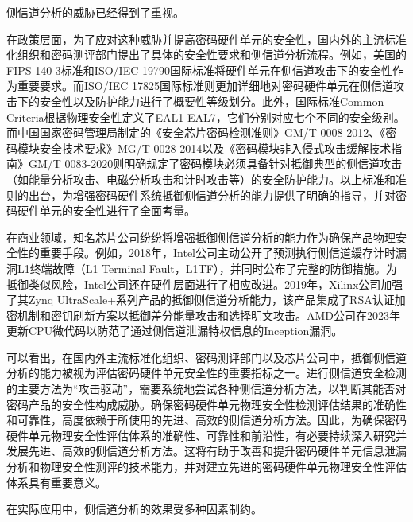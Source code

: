 {	侧信道分析的威胁已经得到了重视。
	
	在政策层面，为了应对这种威胁并提高密码硬件单元的安全性，国内外的主流标准化组织和密码测评部门提出了具体的安全性要求和侧信道分析流程。例如，美国的FIPS 140-3标准\citep{FIPS140-3}和ISO/IEC 19790\citep{ISO/IEC19790}国际标准将硬件单元在侧信道攻击下的安全性作为重要要求。而ISO/IEC 17825\citep{ISO/IEC17825}国际标准则更加详细地对密码硬件单元在侧信道攻击下的安全性以及防护能力进行了概要性等级划分。此外，国际标准Common Criteria\citep{CCMB-2017-04-001}根据物理安全性定义了EAL1-EAL7，它们分别对应七个不同的安全级别。而中国国家密码管理局制定的《安全芯片密码检测准则》GM/T 0008-2012\citep{GM/T0008}、《密码模块安全技术要求》MG/T 0028-2014\citep{GM/T0028}以及《密码模块非入侵式攻击缓解技术指南》GM/T 0083-2020\citep{GM/T0083}则明确规定了密码模块必须具备针对抵御典型的侧信道攻击（如能量分析攻击、电磁分析攻击和计时攻击等）的安全防护能力。以上标准和准则的出台，为增强密码硬件系统抵御侧信道分析的能力提供了明确的指导，并对密码硬件单元的安全性进行了全面考量。
	
	在商业领域，知名芯片公司纷纷将增强抵御侧信道分析的能力作为确保产品物理安全性的重要手段。例如，2018年，Intel公司主动公开了预测执行侧信道缓存计时漏洞L1终端故障（L1 Terminal Fault，L1TF），并同时公布了完整的防御措施\citep{L1TF}。为抵御类似风险，Intel公司还在硬件层面进行了相应改进\citep{AffectedProcessors}。2019年，Xilinx公司加强了其Zynq UltraScale+系列产品的抵御侧信道分析能力，该产品集成了RSA认证加密机制和密钥刷新方案以抵御差分能量攻击和选择明文攻击\citep{UG1085}。AMD公司在2023年更新CPU微代码以防范了通过侧信道泄漏特权信息的Inception漏洞\citep{AMD-SB-7005}。
	
	可以看出，在国内外主流标准化组织、密码测评部门以及芯片公司中，抵御侧信道分析的能力被视为评估密码硬件单元安全性的重要指标之一。进行侧信道安全检测的主要方法为“攻击驱动”，需要系统地尝试各种侧信道分析方法，以判断其能否对密码产品的安全性构成威胁\citep{ISO/IEC15408, GB/T18336}。确保密码硬件单元物理安全性检测评估结果的准确性和可靠性，高度依赖于所使用的先进、高效的侧信道分析方法。因此，为确保密码硬件单元物理安全性评估体系的准确性、可靠性和前沿性，有必要持续深入研究并发展先进、高效的侧信道分析方法。这将有助于改善和提升密码硬件单元信息泄漏分析和物理安全性测评的技术能力，并对建立先进的密码硬件单元物理安全性评估体系具有重要意义。
	
	在实际应用中，侧信道分析的效果受多种因素制约。
	
}
